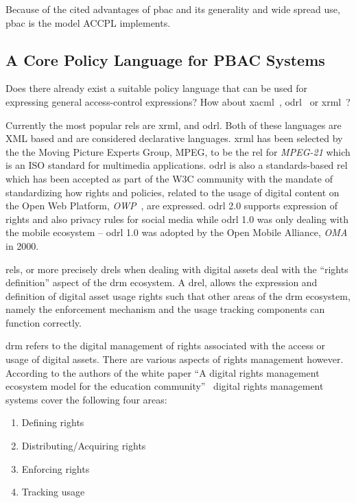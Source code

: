 \documentclass[runningheads,a4paper]{llncs}
\begin{document}
Because of the cited advantages of \ac{pbac} and its generality and wide spread use, \ac{pbac} is the model \ac{ACCPL} implements.

\subsection{A Core Policy Language for PBAC Systems} 

Does there already exist a suitable policy language that can be used for expressing general access-control expressions? How about \ac{xacml}~\cite{xacml3pdf}, \ac{odrl}~\cite{odrloneone} or \ac{xrml}~\cite{Wang}? 

Currently the most popular \ac{rel}s are \ac{xrml}, and \ac{odrl}. Both of these languages are XML based and are considered declarative languages. \ac{xrml} has been selected by the the Moving Picture Experts Group, MPEG, to be the \ac{rel} for \emph{MPEG-21} which is an ISO standard for multimedia applications. \ac{odrl} is also a standards-based \ac{rel} which has been accepted as part of the W3C community with the mandate of standardizing how rights and policies, related to the usage of digital content on the Open Web Platform, \emph{OWP}~\cite{openwebplatform}, are expressed. \ac{odrl} 2.0 supports expression of rights and also privacy rules for social media while \ac{odrl} 1.0 was only dealing with the mobile ecosystem -- \ac{odrl} 1.0 was adopted by the Open Mobile Alliance, \emph{OMA} in 2000.

\ac{rel}s, or more precisely \ac{drel}s when dealing with digital assets deal with the ``rights definition'' aspect of the \ac{drm} ecosystem. A \ac{drel}, allows the expression and definition of digital asset usage rights such that other areas of the \ac{drm} ecosystem, namely the enforcement mechanism and the usage tracking components can function correctly.

\ac{drm} refers to the digital management of rights associated with the access or usage of digital assets. There are various aspects of rights management however. According to the authors of the white paper ``A digital rights management ecosystem model for the education community''~\cite{collier} digital rights management systems cover the following four areas: 

\begin{enumerate}
  \item Defining rights 
  \item Distributing/Acquiring rights 
  \item Enforcing rights 
  \item Tracking usage
\end{enumerate}
\end{document}
